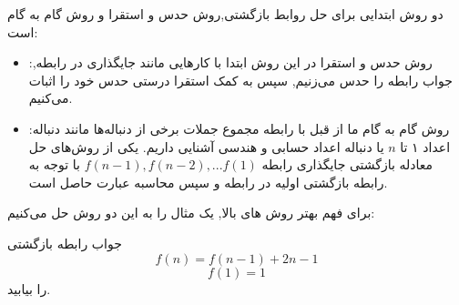 
\p
دو روش ابتدایی برای حل روابط بازگشتی,روش حدس و استقرا و روش گام به گام است:
\begin{itemize}
    \item :روش حدس و استقرا
    \p
    در این روش ابتدا با کارهایی مانند جایگذاری در رابطه, جواب رابطه را حدس می‌زنیم, سپس به کمک استقرا درستی حدس خود را اثبات می‌کنیم.
    \item :روش گام به گام
    \p
 ما از قبل با رابطه مجموع جملات برخی از دنباله‌ها مانند دنباله اعداد ۱ تا 
 $n$
  یا دنباله اعداد حسابی و هندسی
  آشنایی داریم. یکی از روش‌های حل معادله بازگشتی جایگذاری رابطه 
  $f(n-1), f(n-2), ...f(1)$
  با توجه به رابطه بازگشتی اولیه در رابطه و سپس محاسبه عبارت حاصل است.
\end{itemize}

برای فهم بهتر روش های بالا, یک مثال را به این دو روش حل می‌کنیم:

\begin{PROBLEM}
    \p
    جواب رابطه بازگشتی
    $$f(n)=f(n-1)+2n-1$$
    $$f(1)=1$$
    را بیابید.
 \end{PROBLEM}
 
